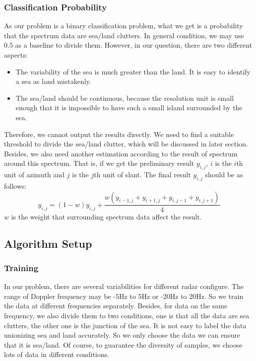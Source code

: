 \subsubsection{Classification Probability}
As our problem is a binary classification problem, what we get is a probability that the spectrum data are sea/land clutters. In general condition, we may use $0.5$ as a baseline to divide them. However, in our question, there are two different aspects:
\begin{itemize}
	\item The variability of the sea is much greater than the land. It is easy to identify a sea as land mistakenly.
	\item The sea/land should be continuous, because the resolution unit is small enough that it is impossible to have such a small island surrounded by the sea.
\end{itemize}
Therefore, we cannot output the results directly. We need to find a suitable threshold to divide the sea/land clutter, which will be discussed in later section. Besides, we also need another estimation according to the result of spectrum around this spectrum. That is, if we get the preliminary result $y_{i, j}$, $i$ is the $i$th unit of azimuth and $j$ is the $j$th unit of slant. The final result $y_{i, j}$ should be as follows:
\begin{equation}
y_{i, j} = (1 - w)  y_{i, j} + \frac{w  (y_{i - 1, j} + y_{i + 1, j} + y_{i, j - 1} + y_{i, j + 1})}{4}
\end{equation}
$w$ is the weight that surrounding spectrum data affect the result.
\subsection{Algorithm Setup}

\subsubsection{Training}
In our problem, there are several variabilities for different radar configure. The range of Doppler frequency may be -5Hz to 5Hz or -20Hz to 20Hz. So we train the data at different frequencies separately. Besides, for data on the same frequency, we also divide them to two conditions, one is that all the data are sea clutters, the other one is the junction of the sea. It is not easy to label the data unionizing sea and land accurately. So we only choose the data we can ensure that it is sea/land. Of course, to guarantee the diversity of samples, we choose lots of data in different conditions.
